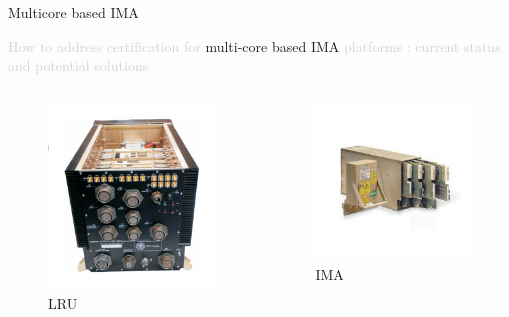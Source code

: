 \documentclass{beamer}
\begin{document}
\begin{frame}[t]{Multicore based IMA}
\begin{center}
    \begin{mdframed}[style=yellowbox]
      {\small\textcolor{lightgray}{How to address certification for} multi-core based IMA \textcolor{lightgray}{platforms :
       current status and potential solutions}}
       \end{mdframed}
  \end{center}
  
  \begin{columns}
  
    \begin{column}{0.45\paperwidth}
        \begin{figure}
            \centering
            \includegraphics[width=0.3\paperwidth]{images/LRU.jpg}
            \caption{LRU}
            \label{fig:lru}
        \end{figure}
    \end{column}
    
    \begin{column}{0.45\paperwidth}
        \begin{figure}
            \centering
            \includegraphics[width=0.3\paperwidth]{images/IMA.jpg}
            \caption{IMA}
            \label{fig:lru}
        \end{figure}
    \end{column}
  
  \end{columns}
  
\end{frame}
\end{document}
